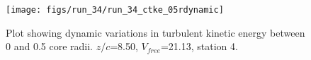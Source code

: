 \begin{figure}[H]
\centering
\texttt{[image: figs/run\_34/run\_34\_ctke\_05rdynamic]}
\caption{Plot showing dynamic variations in turbulent kinetic energy between 0 and 0.5 core radii. $z/c$=8.50, $V_{free}$=21.13, station 4.}
\label{fig:run_34_ctke_05rdynamic}
\end{figure}


